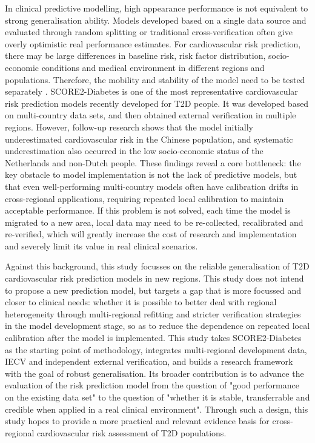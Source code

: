 \documentclass[conference]{IEEEtran}
\begin{document}
In clinical predictive modelling, high appearance performance is not equivalent to strong generalisation ability. Models developed based on a single data source and evaluated through random splitting or traditional cross-verification often give overly optimistic real performance estimates\cite{kernbach2021foundations}. For cardiovascular risk prediction, there may be large differences in baseline risk, risk factor distribution, socio-economic conditions and medical environment in different regions and populations. Therefore, the mobility and stability of the model need to be tested separately \cite{enguita2026external}. SCORE2-Diabetes is one of the most representative cardiovascular risk prediction models recently developed for T2D people. It was developed based on multi-country data sets, and then obtained external verification in multiple regions\cite{score22023score2}. However, follow-up research shows that the model initially underestimated cardiovascular risk in the Chinese population\cite{fu2025external}, and systematic underestimation also occurred in the low socio-economic status of the Netherlands and non-Dutch people\cite{alfaraj2025external}. These findings reveal a core bottleneck: the key obstacle to model implementation is not the lack of predictive models, but that even well-performing multi-country models often have calibration drifts in cross-regional applications, requiring repeated local calibration to maintain acceptable performance. If this problem is not solved, each time the model is migrated to a new area, local data may need to be re-collected, recalibrated and re-verified, which will greatly increase the cost of research and implementation and severely limit its value in real clinical scenarios.

Against this background, this study focusses on the reliable generalisation of T2D cardiovascular risk prediction models in new regions. This study does not intend to propose a new prediction model, but targets a gap that is more focussed and closer to clinical needs: whether it is possible to better deal with regional heterogeneity through multi-regional refitting and stricter verification strategies in the model development stage, so as to reduce the dependence on repeated local calibration after the model is implemented. This study takes SCORE2-Diabetes as the starting point of methodology, integrates multi-regional development data, IECV and independent external verification, and builds a research framework with the goal of robust generalisation. Its broader contribution is to advance the evaluation of the risk prediction model from the question of "good performance on the existing data set" to the question of "whether it is stable, transferrable and credible when applied in a real clinical environment". Through such a design, this study hopes to provide a more practical and relevant evidence basis for cross-regional cardiovascular risk assessment of T2D populations.
\end{document}
